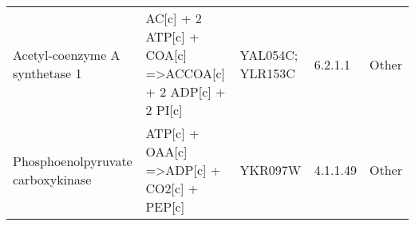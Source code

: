 \begin{table}[H]
\begin{center}
{\begin{tabular}{p{11cm}p{17cm}p{8cm}lp{5cm}}
Acetyl-coenzyme A synthetase 1                                                            & AC{[}c{]} + 2 ATP{[}c{]} + COA{[}c{]} =\textgreater ACCOA{[}c{]} + 2 ADP{[}c{]} + 2 PI{[}c{]}                                                   & YAL054C; YLR153C                                                                                                                                                 & 6.2.1.1            & Other                                                                       \\
Phosphoenolpyruvate carboxykinase                                                         & ATP{[}c{]} + OAA{[}c{]} =\textgreater ADP{[}c{]} + CO2{[}c{]} + PEP{[}c{]}                                                                      & YKR097W                                                                                                                                                          & 4.1.1.49           & Other                                                                       \\ \hline
\end{tabular}}
\label{table:rxns_smallYeast}
\end{center}
\end{table}
